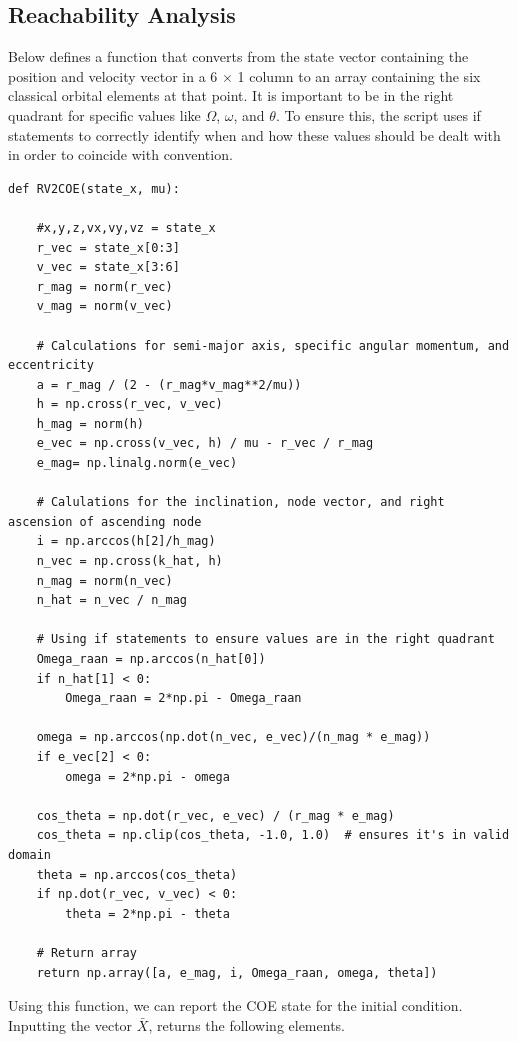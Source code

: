 \documentclass[12pt,twocolumn]{article}  %
\begin{document}
\subsection{Reachability Analysis}
\hspace{0.54em}
Below defines a function that converts from the state vector containing the position and velocity vector in a 6 $\times$ 1 column
to an array containing the six classical orbital elements at that point.
\newline
\newline
\indent
It is important to be in the right quadrant for specific values like $\Omega$, $\omega$, and $\theta$. To ensure this, the script uses if statements
to correctly identify when and how these values should be dealt with in order to coincide with convention.
\begin{lstlisting}
def RV2COE(state_x, mu):
    
    #x,y,z,vx,vy,vz = state_x
    r_vec = state_x[0:3]
    v_vec = state_x[3:6]
    r_mag = norm(r_vec)
    v_mag = norm(v_vec)
    
    # Calculations for semi-major axis, specific angular momentum, and eccentricity
    a = r_mag / (2 - (r_mag*v_mag**2/mu))
    h = np.cross(r_vec, v_vec)
    h_mag = norm(h)
    e_vec = np.cross(v_vec, h) / mu - r_vec / r_mag
    e_mag= np.linalg.norm(e_vec)
    
    # Calulations for the inclination, node vector, and right ascension of ascending node
    i = np.arccos(h[2]/h_mag)
    n_vec = np.cross(k_hat, h)
    n_mag = norm(n_vec)
    n_hat = n_vec / n_mag
    
    # Using if statements to ensure values are in the right quadrant
    Omega_raan = np.arccos(n_hat[0])
    if n_hat[1] < 0:
        Omega_raan = 2*np.pi - Omega_raan

    omega = np.arccos(np.dot(n_vec, e_vec)/(n_mag * e_mag))
    if e_vec[2] < 0:
        omega = 2*np.pi - omega
        
    cos_theta = np.dot(r_vec, e_vec) / (r_mag * e_mag)
    cos_theta = np.clip(cos_theta, -1.0, 1.0)  # ensures it's in valid domain
    theta = np.arccos(cos_theta)
    if np.dot(r_vec, v_vec) < 0:
        theta = 2*np.pi - theta
    
    # Return array
    return np.array([a, e_mag, i, Omega_raan, omega, theta])
\end{lstlisting}

Using this function, we can report the COE state for the initial condition. Inputting the vector $\bar{X}$, returns the following elements.
\end{document}

